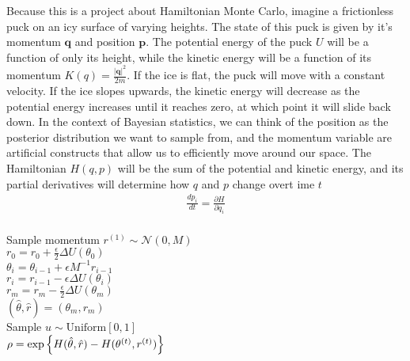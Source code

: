 Because this is a project about Hamiltonian Monte Carlo, imagine a frictionless puck on an icy surface of varying heights. The state of this puck is given by it's momentum $\bm{q}$ and position $\bm{p}$. The potential energy of the puck $U$ will be a function of only its height, while the kinetic energy will be a function of its momentum $K(q)=\frac{|\bm{q}|^2}{2m}$. If the ice is flat, the puck will move with a constant velocity. If the ice slopes upwards, the kinetic energy will decrease as the potential energy increases until it reaches zero, at which point it will slide back down. In the context of Bayesian statistics, we can think of the position as the posterior distribution we want to sample from, and the momentum variable are artificial constructs that allow us to efficiently move around our space. The Hamiltonian $H(q, p)$ will be the sum of the potential and kinetic energy, and its partial derivatives will determine how $q$ and $p$ change overt ime $t$
\begin{equation*}
	\begin{split}
	\frac{d p_i}{d t}=\frac{\partial H}{\partial q_i}\\
	\
	\end{split}
\end{equation*}

\begin{algorithm}[H]
	 {
		Sample momentum $r^{(1)}\sim\mathcal{N}(0, M)$\\
		$r_0=r_0+\frac{\epsilon}{2}\Delta U(\theta_0)$\\
		 {
			$\theta_i=\theta_{i-1}+\epsilon M^{-1}r_{i-1}$\\
			$r_i = r_{i-1} - \epsilon  \Delta U(\theta_i)$\\
		}
		$r_m = r_m -\frac{\epsilon}{2}\Delta U(\theta_m)$\\
		$(\hat{\theta}, \hat{r})=(\theta_m,r_m)$\\
		Sample $u\sim\mathrm{Uniform}[0, 1]$\\
		$\rho = \exp\left\lbrace H(\hat{\theta}, \hat{r})-H(\theta^{(t)}, r^{(t)}) \right\rbrace$\\
		\If{$u < \min(1, \rho)$}{$\theta^{(t+1)} = \hat{\theta}$}
	}
\end{algorithm}